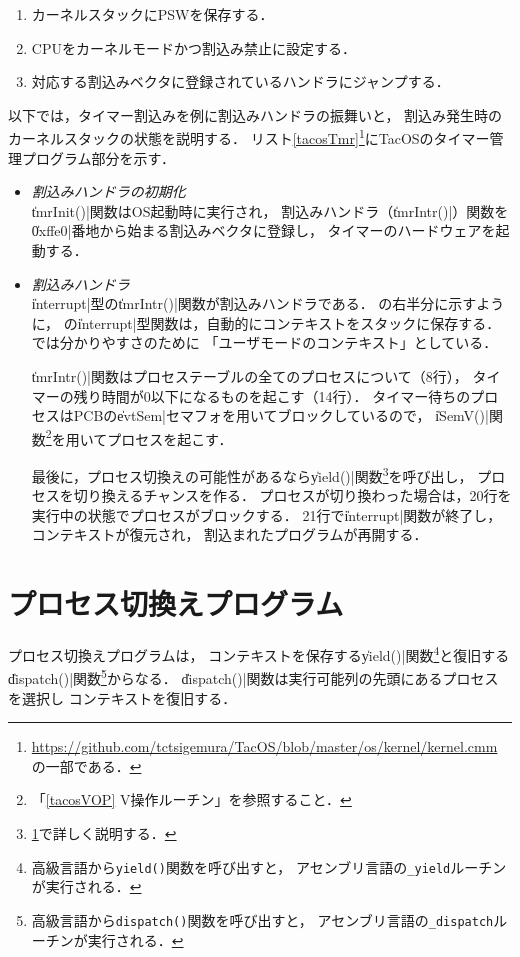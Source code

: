 \begin{enumerate}
\item カーネルスタックにPSWを保存する．
\item CPUをカーネルモードかつ割込み禁止に設定する．
\item 対応する割込みベクタに登録されているハンドラにジャンプする．
\end{enumerate}

以下では，タイマー割込みを例に割込みハンドラの振舞いと，
割込み発生時のカーネルスタックの状態を説明する．
リスト\ref{tacosTmr}\footnote{
  \url{https://github.com/tctsigemura/TacOS/blob/master/os/kernel/kernel.cmm}
  の一部である．
}にTacOSのタイマー管理プログラム部分を示す．



\begin{itemize}
\item \emph{割込みハンドラの初期化} \\
  \|tmrInit()|関数はOS起動時に実行され，
  割込みハンドラ（\|tmrIntr()|）関数を
  \|0xffe0|番地から始まる割込みベクタに登録し，
  タイマーのハードウェアを起動する．
\item \emph{割込みハンドラ} \\
  \|interrupt|型の\|tmrIntr()|関数が割込みハンドラである．
  の右半分に示すように，
  \cmml の\|interrupt|型関数は，自動的にコンテキストをスタックに保存する．
  では分かりやすさのために
  「ユーザモードのコンテキスト」としている．

  \|tmrIntr()|関数はプロセステーブルの全てのプロセスについて（8行），
  タイマーの残り時間が0以下になるものを起こす（14行）．
  タイマー待ちのプロセスはPCBの\|evtSem|セマフォを用いてブロックしているので，
  \|iSemV()|関数\footnote{
    「\ref{tacosVOP} V操作ルーチン」を参照すること．
  }を用いてプロセスを起こす．

  最後に，プロセス切換えの可能性があるなら\|yield()|関数\footnote{
    \ref{tacosProcSwitch}で詳しく説明する．
  }を呼び出し，
  プロセスを切り換えるチャンスを作る．
  プロセスが切り換わった場合は，20行を実行中の状態でプロセスがブロックする．
  21行で\|interrupt|関数が終了し，コンテキストが復元され，
  割込まれたプログラムが再開する．
\end{itemize}

\section{プロセス切換えプログラム}
\label{tacosProcSwitch}
プロセス切換えプログラムは，
コンテキストを保存する\|yield()|関数\footnote{
  高級言語から\texttt{yield()}関数を呼び出すと，
  アセンブリ言語の\texttt{\_yield}ルーチンが実行される．
}と復旧する\|dispatch()|関数\footnote{
  高級言語から\texttt{dispatch()}関数を呼び出すと，
  アセンブリ言語の\texttt{\_dispatch}ルーチンが実行される．
}からなる．
\|dispatch()|関数は実行可能列の先頭にあるプロセスを選択し
コンテキストを復旧する．

